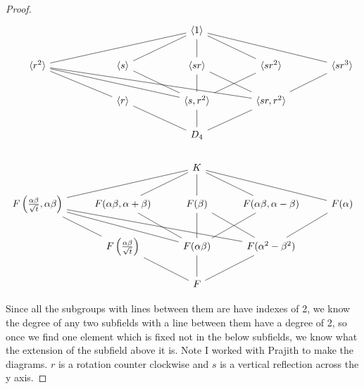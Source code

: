 \documentclass{article}
\begin{document}
\begin{proof}
    
    \[\begin{tikzcd}
        && {\langle 1 \rangle} \\
        {\langle r^2 \rangle} & {\langle s \rangle} & {\langle sr \rangle} & {\langle sr^2 \rangle} & {\langle sr^3 \rangle} \\
        & {\langle r \rangle} & {\langle s, r^2 \rangle} & {\langle sr, r^2 \rangle} \\
        && {D_4} \\
        && K \\
        {F\left(\frac{\alpha \beta}{\sqrt{t}}, \alpha\beta\right)} & {F(\alpha\beta, \alpha + \beta)} & {F(\beta)} & {F(\alpha\beta, \alpha - \beta)} & {F(\alpha)} \\
        & {F\left(\frac{\alpha \beta}{\sqrt{t}}\right)} & {F(\alpha \beta)} & {F(\alpha^2 - \beta^2)} \\
        && F
        \arrow[no head, from=2-1, to=1-3]
        \arrow[no head, from=2-1, to=3-4]
        \arrow[no head, from=2-2, to=1-3]
        \arrow[no head, from=2-2, to=3-3]
        \arrow[no head, from=2-3, to=1-3]
        \arrow[no head, from=2-4, to=1-3]
        \arrow[no head, from=2-5, to=1-3]
        \arrow[no head, from=3-2, to=2-1]
        \arrow[no head, from=3-3, to=2-1]
        \arrow[no head, from=3-3, to=2-3]
        \arrow[no head, from=3-3, to=2-4]
        \arrow[no head, from=3-4, to=2-3]
        \arrow[no head, from=3-4, to=2-5]
        \arrow[no head, from=4-3, to=3-2]
        \arrow[no head, from=4-3, to=3-3]
        \arrow[no head, from=4-3, to=3-4]
        \arrow[no head, from=6-1, to=5-3]
        \arrow[no head, from=6-1, to=7-2]
        \arrow[no head, from=6-1, to=7-3]
        \arrow[no head, from=6-1, to=7-4]
        \arrow[no head, from=6-2, to=5-3]
        \arrow[no head, from=6-2, to=7-3]
        \arrow[no head, from=6-3, to=5-3]
        \arrow[no head, from=6-3, to=7-3]
        \arrow[no head, from=6-3, to=7-4]
        \arrow[no head, from=6-4, to=5-3]
        \arrow[no head, from=6-4, to=7-3]
        \arrow[no head, from=6-5, to=5-3]
        \arrow[no head, from=6-5, to=7-4]
        \arrow[no head, from=7-3, to=8-3]
        \arrow[no head, from=8-3, to=7-2]
        \arrow[no head, from=8-3, to=7-4]
    \end{tikzcd}\]
    
    Since all the subgroups with lines between them are have indexes of 2, we know the degree of any two subfields with a line between them have a degree of 2, so once we find one element which is fixed not in the below subfields, we know what the extension of the subfield above it is. Note I worked with Prajith to make the diagrams. $r$ is a rotation counter clockwise and $s$ is a vertical reflection across the y axis. 
    

\end{proof}
\end{document}
